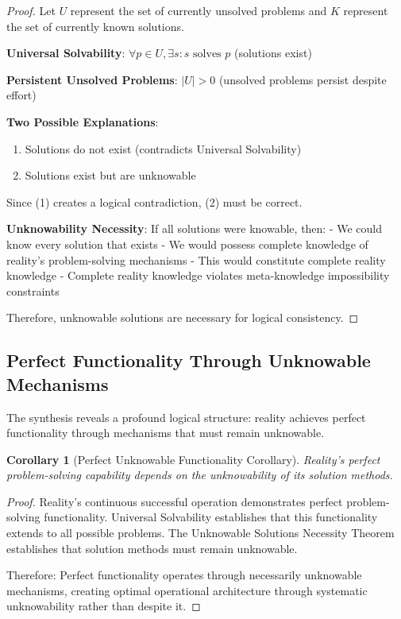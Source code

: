 \documentclass[12pt,a4paper]{article}
\newtheorem{corollary}[theorem]{Corollary}
\begin{document}
\begin{proof}
Let $U$ represent the set of currently unsolved problems and $K$ represent the set of currently known solutions.

\textbf{Universal Solvability}: $\forall p \in U, \exists s : s \text{ solves } p$ (solutions exist)

\textbf{Persistent Unsolved Problems}: $|U| > 0$ (unsolved problems persist despite effort)

\textbf{Two Possible Explanations}:
\begin{enumerate}
\item Solutions do not exist (contradicts Universal Solvability)
\item Solutions exist but are unknowable
\end{enumerate}

Since (1) creates a logical contradiction, (2) must be correct.

\textbf{Unknowability Necessity}: If all solutions were knowable, then:
- We could know every solution that exists
- We would possess complete knowledge of reality's problem-solving mechanisms
- This would constitute complete reality knowledge
- Complete reality knowledge violates meta-knowledge impossibility constraints

Therefore, unknowable solutions are necessary for logical consistency.
\end{proof}

\subsection{Perfect Functionality Through Unknowable Mechanisms}

The synthesis reveals a profound logical structure: reality achieves perfect functionality through mechanisms that must remain unknowable.

\begin{corollary}[Perfect Unknowable Functionality Corollary]
Reality's perfect problem-solving capability depends on the unknowability of its solution methods.
\end{corollary}

\begin{proof}
Reality's continuous successful operation demonstrates perfect problem-solving functionality. Universal Solvability establishes that this functionality extends to all possible problems. The Unknowable Solutions Necessity Theorem establishes that solution methods must remain unknowable.

Therefore: Perfect functionality operates through necessarily unknowable mechanisms, creating optimal operational architecture through systematic unknowability rather than despite it.
\end{proof}
\end{document}
